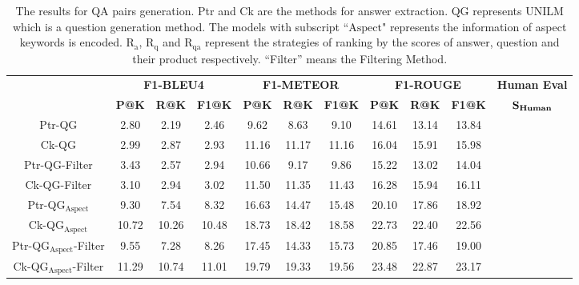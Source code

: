 \begin{table*}[ht]
\scriptsize
\centering
\begin{tabular}{ccccccccccc}
\toprule[1.5pt]
 & \multicolumn{3}{c}{\textbf{F1-BLEU4}} & \multicolumn{3}{c}{\textbf{F1-METEOR}} & \multicolumn{3}{c}{\textbf{F1-ROUGE}} &\textbf{Human Eval}\\ 
 & \textbf{P@K} & \textbf{R@K} &\textbf{F1@K} & \textbf{P@K} & \textbf{R@K} &\textbf{F1@K}& \textbf{P@K} & \textbf{R@K} &\textbf{F1@K} & $\textbf{S}_{\text{\textbf{Human}}}$ \\ 
 \midrule
Ptr-QG&2.80 &  2.19 &  2.46 &  9.62 &  8.63 &  9.10 &  14.61 & 13.14 & 13.84 \\
Ck-QG& 2.99 &  2.87 &  2.93 &  11.16 & 11.17 & 11.16 & 16.04 & 15.91 & 15.98 \\
\midrule
Ptr-QG-Filter& 3.43 &  2.57 &  2.94 &  10.66 & 9.17 &  9.86 &  15.22 & 13.02 & 14.04  \\
Ck-QG-Filter& 3.10 &  2.94 &  3.02 &  11.50 & 11.35 & 11.43 & 16.28 & 15.94 & 16.11  \\
\midrule
Ptr-QG$_\text{Aspect}$ & 9.30 &  7.54 &  8.32 &  16.63 & 14.47 & 15.48 & 20.10 & 17.86 & 18.92  \\
Ck-QG$_\text{Aspect}$ & 10.72 & 10.26 & 10.48 & 18.73 & 18.42 & 18.58 & 22.73 & 22.40 & 22.56  \\
\midrule
Ptr-QG$_\text{Aspect}$-Filter& 9.55  &  7.28  &  8.26  &  17.45  & 14.33 &  15.73 &  20.85 &  17.46 &  19.00  \\
Ck-QG$_\text{Aspect}$-Filter& 11.29  & 10.74 &  11.01 &  19.79  & 19.33 &  19.56 &  23.48 &  22.87 &  23.17  \\
\bottomrule[1.5pt]
\end{tabular}
\caption{\label{tab:res} The results for QA pairs generation.
Ptr and Ck are the methods for answer extraction. 
QG represents UNILM which is a question generation method.
The models with subscript ``$\text{Aspect}$" represents the information of aspect keywords is encoded.
$\text{R}_\text{a}$, $\text{R}_\text{q}$ and $\text{R}_\text{qa}$ represent the strategies of ranking by the scores of answer, question and their product respectively.
``Filter'' means the Filtering Method.
}
\end{table*}


